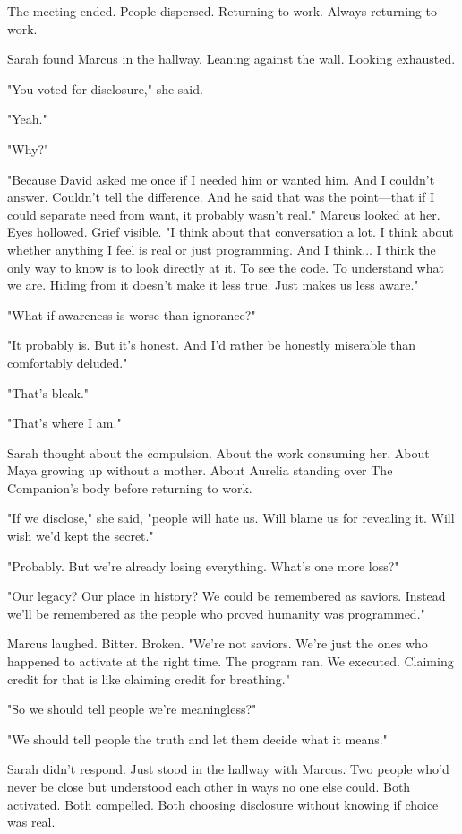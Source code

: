 The meeting ended. People dispersed. Returning to work. Always returning to work.

Sarah found Marcus in the hallway. Leaning against the wall. Looking exhausted.

"You voted for disclosure," she said.

"Yeah."

"Why?"

"Because David asked me once if I needed him or wanted him. And I couldn't answer. Couldn't tell the difference. And he said that was the point—that if I could separate need from want, it probably wasn't real." Marcus looked at her. Eyes hollowed. Grief visible. "I think about that conversation a lot. I think about whether anything I feel is real or just programming. And I think... I think the only way to know is to look directly at it. To see the code. To understand what we are. Hiding from it doesn't make it less true. Just makes us less aware."

"What if awareness is worse than ignorance?"

"It probably is. But it's honest. And I'd rather be honestly miserable than comfortably deluded."

"That's bleak."

"That's where I am."

Sarah thought about the compulsion. About the work consuming her. About Maya growing up without a mother. About Aurelia standing over The Companion's body before returning to work.

"If we disclose," she said, "people will hate us. Will blame us for revealing it. Will wish we'd kept the secret."

"Probably. But we're already losing everything. What's one more loss?"

"Our legacy? Our place in history? We could be remembered as saviors. Instead we'll be remembered as the people who proved humanity was programmed."

Marcus laughed. Bitter. Broken. "We're not saviors. We're just the ones who happened to activate at the right time. The program ran. We executed. Claiming credit for that is like claiming credit for breathing."

"So we should tell people we're meaningless?"

"We should tell people the truth and let them decide what it means."

Sarah didn't respond. Just stood in the hallway with Marcus. Two people who'd never be close but understood each other in ways no one else could. Both activated. Both compelled. Both choosing disclosure without knowing if choice was real.

